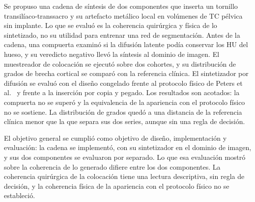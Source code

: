 
Se propuso una cadena de síntesis de dos componentes que inserta un tornillo transilíaco-transsacro y su artefacto metálico local en volúmenes de TC pélvica sin implante. Lo que se evaluó es la coherencia quirúrgica y física de lo sintetizado, no su utilidad para entrenar una red de segmentación. Antes de la cadena, una compuerta examinó si la difusión latente podía conservar los HU del hueso, y su veredicto negativo llevó la síntesis al dominio de imagen. El muestreador de colocación se ejecutó sobre dos cohortes, y su distribución de grados de brecha cortical se comparó con la referencia clínica. El sintetizador por difusión se evaluó con el diseño congelado frente al protocolo físico de Peters et al.~\cite{peters2025hybrid} y frente a la inserción por copia y pegado. Los resultados son acotados: la compuerta no se superó y la equivalencia de la apariencia con el protocolo físico no se sostiene. La distribución de grados quedó a una distancia de la referencia clínica menor que la que separa sus dos series, aunque sin una regla de decisión.


El objetivo general se cumplió como objetivo de diseño, implementación y evaluación: la cadena se implementó, con su sintetizador en el dominio de imagen, y sus dos componentes se evaluaron por separado. Lo que esa evaluación mostró sobre la coherencia de lo generado difiere entre los dos componentes. La coherencia quirúrgica de la colocación tiene una lectura descriptiva, sin regla de decisión, y la coherencia física de la apariencia con el protocolo físico no se estableció.

